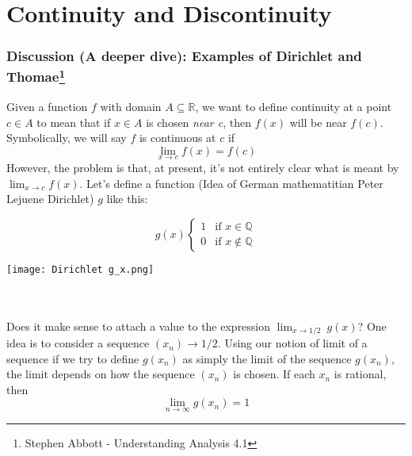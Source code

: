 
\section{Continuity and Discontinuity}


\subsubsection*{Discussion (A deeper dive): Examples of Dirichlet and Thomae\footnote{Stephen Abbott - Understanding Analysis 4.1}}
Given a function $f$ with domain $A \subseteq \mathbb{R}$, we want to define continuity at a point $c \in A$ to mean that if $x \in A$ is chosen \textit{near c}, then $f(x)$ will be near $f(c)$. \\
Symbolically, we will say $f$ is continuous at $c$ if
$$ \lim_{x \to c} f(x) = f(c) $$
However, the problem is that, at present, it's not entirely clear what is meant by $ \lim_{x \to c} f(x) $. Let's define a function (Idea of German mathematitian Peter Lejuene Dirichlet) $g$ like this:\\
\begin{minipage}{0.45\textwidth}
    \begin{equation*}
        g(x)
        \begin{cases}
            1 & \text{if } x \in \mathbb{Q} \\
            0 & \text{if } x \notin \mathbb{Q}
        \end{cases}
    \end{equation*}
\end{minipage}
\begin{minipage}{0.45\textwidth}
    \centering
    \texttt{[image: Dirichlet g\_x.png]}
\end{minipage} \\~\\
Does it make sense to attach a value to the expression $\lim_{x \to 1/2} \ g(x)$? One idea is to consider a sequence $(x_n) \to 1/2$. Using our notion of limit of a sequence if we try to define $g(x_n)$  as simply the limit of the sequence $g(x_n)$, the limit depends on how the sequence $(x_n)$ is chosen. If each $x_n$ is rational, then \[
    \lim_{n \to \infty} g(x_n) = 1
\]

